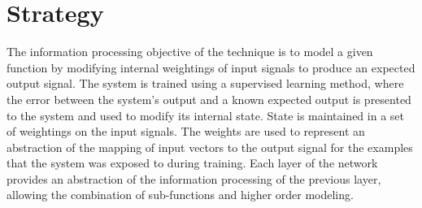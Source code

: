 \documentclass[a4paper, 11pt]{article}
\begin{document}

\section{Strategy}
\label{sec:strategy}
The information processing objective of the technique is to model a given function by modifying internal weightings of input signals to produce an expected output signal.
The system is trained using a supervised learning method, where the error between the system's output and a known expected output is presented to the system and used to modify its internal state. State is maintained in a set of weightings on the input signals. The weights are used to represent an abstraction of the mapping of input vectors to the output signal for the examples that the system was exposed to during training.
Each layer of the network provides an abstraction of the information processing of the previous layer, allowing the combination of sub-functions and higher order modeling.
\end{document}
